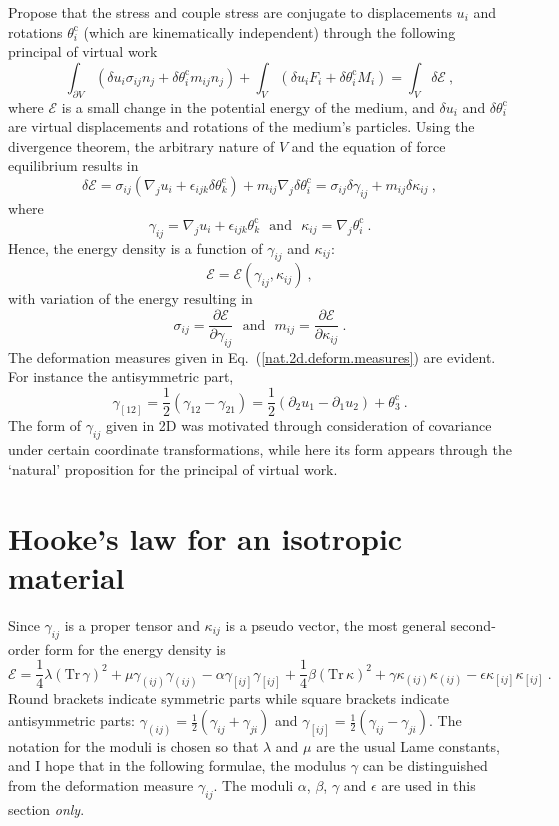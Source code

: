 \documentclass[]{scrreprt}
\newcommand{\si}{\sigma}
\newcommand{\mand}{\ \ \ \mbox{and}\ \ \ }
\newcommand{\pl}{\partial}
\newcommand{\ha}{\mbox{$\frac{1}{2}$}}
\newcommand{\thetac}{\theta^{\mathrm{c}}}
\newcommand{\ep}{\epsilon}
\newcommand{\ga}{\gamma}
\newcommand{\de}{\delta}
\newcommand{\ka}{\kappa}
\newcommand{\la}{\lambda}
\newcommand{\tr}{\mbox{Tr}\,}
\newcommand{\al}{\alpha}
\newcommand{\be}{\beta}
\begin{document}
Propose that the stress and couple stress are conjugate to
displacements $u_{i}$ and rotations $\thetac_{i}$ (which are kinematically
independent) through the following principal of virtual work
$$
\int_{\pl V}\left(\de u_{i}\si_{ij}n_{j} + \de\thetac_{i} m_{ij}n_{j}\right) +
\int_{V}\left(\de u_{i}F_{i} + \de\thetac_{i} M_{i}\right) = \int_{V}\de\mathcal{E} \ ,
$$
where $\mathcal{E}$ is a small change in the potential energy of the
medium, and $\de u_{i}$ and $\de\thetac_{i}$ are virtual displacements and
rotations of the medium's particles.  Using the divergence theorem,
the arbitrary nature of $V$ and the equation of force equilibrium
results in
$$
\de\mathcal{E} = \si_{ij}\left(\nabla_{j}u_{i}+\ep_{ijk}\de\thetac_{k}\right) +
m_{ij}\nabla_{j}\de\thetac_{i} = \si_{ij}\de\ga_{ij} + m_{ij}\de\ka_{ij}
\ ,
$$
where
\begin{equation}
\ga_{ij} = \nabla_{j}u_{i} + \ep_{ijk}\thetac_{k} \mand
\ka_{ij} = \nabla_{j}\thetac_{i} \ .
\label{ga.and.om.defns}
\end{equation}
Hence, the energy density is a function of $\ga_{ij}$ and $\ka_{ij}$:
$$
\mathcal{E} = \mathcal{E}(\ga_{ij},\ka_{ij}) \ ,
$$
with variation of the energy resulting in
$$
\si_{ij} = \frac{\pl \mathcal{E}}{\pl \ga_{ij}} \mand
m_{ij} = \frac{\pl \mathcal{E}}{\pl \ka_{ij}} \ .
$$
The deformation measures given in Eq.~(\ref{nat.2d.deform.measures})
are evident.  For instance the antisymmetric part,
$$
\ga_{[12]}=\ha(\ga_{12}-\ga_{21}) =
\ha(\pl_{2}u_{1}-\pl_{1}u_{2})+\thetac_{3} \ .
$$
The form of $\ga_{ij}$ given in 2D was motivated through consideration
of covariance under certain coordinate transformations, while here its
form appears through the `natural' proposition for the principal of
virtual work.

\section{Hooke's law for an isotropic material}

Since $\ga_{ij}$ is a proper tensor and $\ka_{ij}$ is a pseudo
vector, the most general second-order form for the energy density is
$$
\mathcal{E} = \mbox{$\frac{1}{4}$}\la(\tr\ga)^{2} +
\mu\ga_{(ij)}\ga_{(ij)} - \al\ga_{[ij]}\ga_{[ij]}
+ \mbox{$\frac{1}{4}$}\be(\tr\ka)^{2} +
\ga\ka_{(ij)}\ka_{(ij)} - \ep\ka_{[ij]}\ka_{[ij]}  \ .
$$
Round brackets indicate symmetric parts while square brackets indicate
antisymmetric parts: $\ga_{(ij)} = \ha(\ga_{ij}+\ga_{ji})$ and
$\ga_{[ij]}=\ha(\ga_{ij}-\ga_{ji})$.  The notation for the moduli is
chosen so that $\la$ and $\mu$ are the usual Lame constants, and I
hope that in the following formulae, the modulus $\ga$ can be
distinguished from the deformation measure $\ga_{ij}$.  The moduli
$\al$, $\be$, $\ga$ and $\ep$ are used in this section {\em only}.
\end{document}
